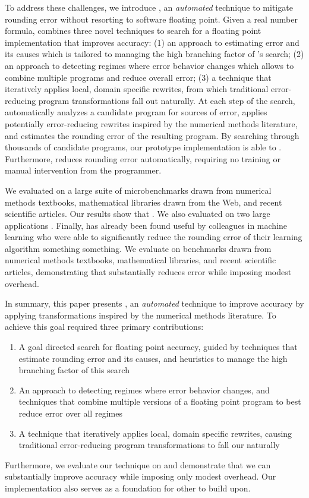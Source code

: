 \documentclass[paper.tex]{subfiles}
\begin{document}
To address these challenges, we introduce \casio, an
\textit{automated} technique to mitigate rounding error without
resorting to software floating point.  Given a real number formula,
\casio combines three novel techniques to search for a floating point
implementation that improves accuracy: (1) an approach to estimating
error and its causes which is tailored to managing the high branching
factor of \casio's search; (2) an approach to detecting regimes where
error behavior changes which allows \casio to combine multiple
programs and reduce overall error; (3) a technique that iteratively
applies local, domain specific rewrites, from which traditional
error-reducing program transformations fall out naturally.  At each
step of the search, \casio automatically analyzes a candidate program
for sources of error, applies potentially error-reducing rewrites
inspired by the numerical methods literature, and estimates the
rounding error of the resulting program.  By searching through
thousands of candidate programs, our prototype implementation is able
to .  Furthermore, \casio
reduces rounding error automatically, requiring no training or manual
intervention from the programmer.

We evaluated \casio on a large suite of microbenchmarks drawn from
numerical methods textbooks, mathematical libraries drawn from the
Web, and recent scientific articles.  Our results show that \casio
{}.  We also evaluated \casio on two large applications
.  Finally, \casio has already been found useful by
colleagues in machine learning who were able to significantly reduce
the rounding error of their learning algorithm something something.
We evaluate \casio on benchmarks drawn from numerical methods
textbooks, mathematical libraries, and recent scientific articles,
demonstrating that \casio substantially reduces error while imposing
modest overhead.

In summary, this paper presents \casio, an \textit{automated}
technique to improve accuracy by applying transformations inspired by
the numerical methods literature. To achieve this goal required three
primary contributions:
\begin{enumerate}
\item A goal directed search for floating point accuracy, guided by
  techniques that estimate rounding error and its causes,
  and heuristics to manage the high branching factor of this search
\item An approach to detecting regimes where error behavior changes,
  and techniques that combine multiple versions of a floating point
  program to best reduce error over all regimes
\item A technique that iteratively applies local, domain specific rewrites,
  causing traditional error-reducing program transformations
  to fall our naturally
\end{enumerate}
Furthermore, we evaluate our technique on  and demonstrate that we can substantially improve
accuracy while imposing only modest overhead.  Our implementation also
serves as a foundation for other to build upon.
\end{document}
